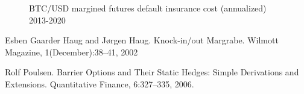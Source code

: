 \documentclass[12pt]{article}
\begin{document}
\begin{figure}
    \centering
    \caption{BTC/USD margined futures default insurance cost (annualized) 2013-2020 }
    \label{fig:FutMarginDefaultCost}
    
\end{figure}











\begin{thebibliography}{}


 Esben Gaarder Haug and Jørgen Haug. Knock-in/out Margrabe. Wilmott Magazine, 1(December):38–41, 2002

 Rolf Poulsen. Barrier Options and Their Static Hedges: Simple Derivations and
Extensions. Quantitative Finance, 6:327–335, 2006.







\end{thebibliography}
\end{document}
